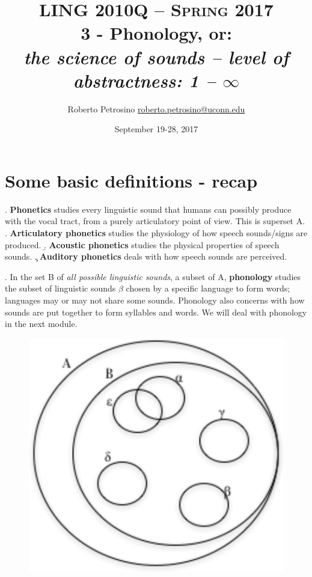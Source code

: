 \documentclass[11pt, oneside]{article}   	%
\title{{\normalsize LING 2010Q -- {\scshape Spring 2017}} \\ {\bfseries 3 - Phonology}, or: \\ {\itshape the science of sounds -- level of abstractness: 1 -- $\infty$}}
\author{Roberto Petrosino \hspace{0.2cm} \url{roberto.petrosino@uconn.edu}}
\date{September 19-28, 2017}
\begin{document}
\maketitle
\tableofcontents

\newpage

\section{Some basic definitions - recap}

\ex. {\bfseries Phonetics} studies every linguistic sound that humans can possibly produce with the vocal tract, from a purely articulatory point of view. This is superset A. 
\a. {\bfseries Articulatory phonetics} studies the physiology of how speech sounds/signs are produced. 
\b. {\bfseries Acoustic phonetics} studies the physical properties of speech sounds. 
\c. {\bfseries Auditory phonetics} deals with how speech sounds are perceived.

\ex. In the set B of {\itshape all possible linguistic sounds}, a subset of A, {\bfseries phonology} studies the subset of linguistic sounds $\beta$ chosen by a specific language to form words; languages may or may not share some sounds. Phonology also concerns with how sounds are put together to form syllables and words. We will deal with phonology in the next module. 

\begin{figure}[H]
\centering
\includegraphics[scale=0.9]{sounds_sets}
\end{figure}%
\end{document}
